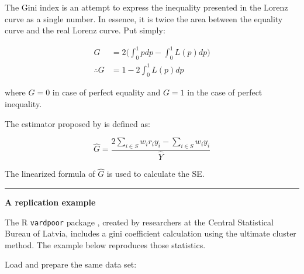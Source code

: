 \documentclass[
]{book}
\begin{document}
The Gini index is an attempt to express the inequality presented in the Lorenz curve as a single number. In essence, it is twice the area between the equality curve and the real Lorenz curve. Put simply:

\[
\begin{aligned}
G &= 2 \bigg( \int_{0}^{1} pdp - \int_{0}^{1} L(p)dp \bigg) \\
\therefore G &= 1 - 2 \int_{0}^{1} L(p)dp
\end{aligned}
\]

where \(G=0\) in case of perfect equality and \(G = 1\) in the case of perfect inequality.

The estimator proposed by \textcite{osier2009} is defined as:

\[
\widehat{G} = \frac{ 2 \sum_{i \in S} w_i r_i y_i - \sum_{i \in S} w_i y_i }{ \hat{Y} }
\]

The linearized formula of \(\widehat{G}\) is used to calculate the SE.

\begin{center}\rule{0.5\linewidth}{0.5pt}\end{center}

\textbf{A replication example}

The R \texttt{vardpoor} package \autocite{vardpoor}, created by researchers at the Central Statistical Bureau of Latvia, includes a gini coefficient calculation using the ultimate cluster method. The example below reproduces those statistics.

Load and prepare the same data set:
\end{document}

